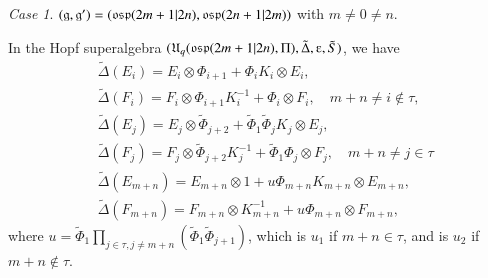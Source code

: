 \documentclass[12pt]{amsart}
\theoremstyle{definition}
\theoremstyle{remark}
\numberwithin{equation}{section}
\newtheorem{case}{Case}
\begin{document}
\begin{case}
$({{\mathfrak g}},{{\mathfrak g}}')=({{\rm\mathfrak{osp}}}(2m+1|2n), {{\rm\mathfrak{osp}}}(2n+1|2m))$ with $m\ne 0\ne n$.
\end{case}

In the Hopf superalgebra $({{\mathfrak U}}_q({{\rm\mathfrak{osp}}}(2m+1|2n),\Pi), {\tilde{\Delta}},{\varepsilonup},{\tilde{S}})$,  we have
\[\begin{aligned}
&{\tilde{\Delta}}(E_i)=E_i\otimes\Phi_{i+1}+\Phi_iK_i\otimes E_i, \\
&{\tilde{\Delta}}(F_i)=F_i\otimes\Phi_{i+1}K_i^{-1}+\Phi_i\otimes F_i, \quad m+n\ne i\notin\tau,\\
&{\tilde{\Delta}}(E_j)=E_j\otimes\tilde{\Phi}_{j+2}+\tilde{\Phi}_1\tilde{\Phi}_jK_j\otimes E_j,\\
&{\tilde{\Delta}}(F_j)=F_j\otimes\tilde{\Phi}_{j+2}K_j^{-1}+\tilde{\Phi}_1\Phi_j\otimes F_j, \quad m+n\ne j\in\tau\\
&{\tilde{\Delta}}(E_{m+n})=E_{m+n}\otimes 1+u\Phi_{m+n}K_{m+n}\otimes E_{m+n},\\
&{\tilde{\Delta}}(F_{m+n})=F_{m+n}\otimes K_{m+n}^{-1}+u\Phi_{m+n}\otimes F_{m+n},
\end{aligned}\]
where  $u=\tilde{\Phi}_1\prod_{j\in\tau,j\neq m+n}(\tilde{\Phi}_1\tilde{\Phi}_{j+1})$, which is $u_1$ if $m+n\in\tau$, and is $u_2$ if $m+n\notin\tau$.
\end{document}
